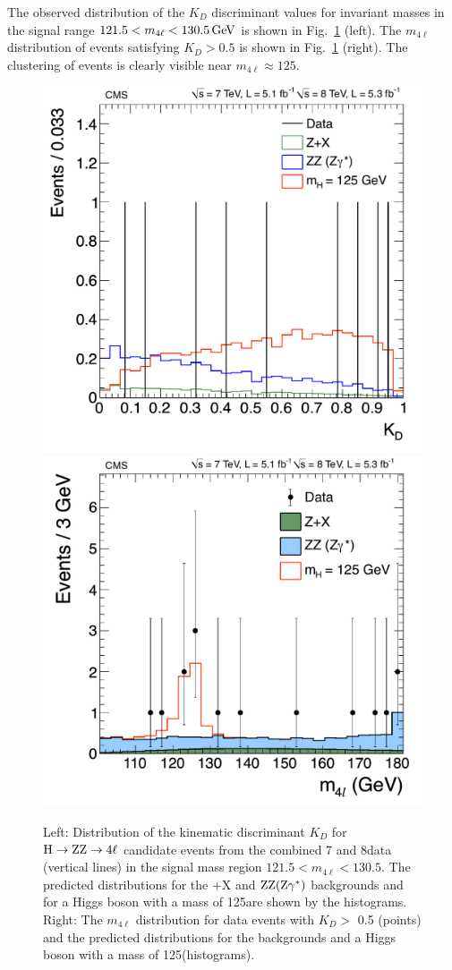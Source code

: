 \documentclass[12pt,twoside,a4paper,cmspaper,final,collab]{cms-tdr}
\begin{document}
The observed distribution of the $K_{D}$ discriminant values for invariant masses in
the signal range $121.5 < m_{4\ell} < 130.5\,\text{Ge\hspace{-.08em}V}$ is shown
in Fig.~\ref{fig:Mass4lKD05} (left).
The $m_{4\ell}$ distribution of events satisfying $K_{D} > 0.5$ is shown
in Fig.~\ref{fig:Mass4lKD05} (right). The clustering of events is clearly visible near $m_{4\ell}$$\approx$$125$\GeV.
\begin{figure}[!htb]
\begin{center}
\includegraphics[width=0.49\linewidth]{figures/HZZ_LD_lowmass_7Plus8TeV}
\includegraphics[width=0.5\linewidth]{figures/HZZ_Mass_7Plus8TeV_100-180_Mela05}
\caption{
Left: Distribution of the kinematic discriminant $K_D$ for $\mathrm{H} \to \mathrm{Z}\mathrm{Z} \to  4\ell$ candidate events
from the combined 7  and 8\TeV data (vertical lines) in the signal mass region $121.5 < m_{4\ell} < 130.5$\GeV.
The predicted distributions for the \cPZ+X and $\mathrm{Z}\mathrm{Z}(\mathrm{Z}\gamma^*)$ backgrounds and for a Higgs boson
with a mass of 125\GeV are shown by the histograms.
Right: The $m_{4\ell}$ distribution for data events with $K_D >$ 0.5 (points) and the predicted distributions
for the backgrounds and a Higgs boson with a mass of 125\GeV (histograms).
}
\label{fig:Mass4lKD05}
\end{center}
\end{figure}
\end{document}

